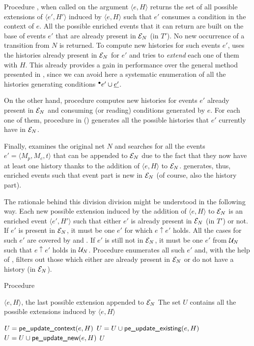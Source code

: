 Procedure \peupdatecont{}, when called on the argument $\langle e, H \rangle$
returns the set of all possible extensions of $\langle e', H' \rangle$ induced
by $\langle e, H \rangle$ such that $e'$ consumes a condition in the context of
$e$.  All the possible enriched events that it can return are built on the base
of events $e'$ that are already present in $\mathcal{E}_{N}$ (in $T'$).  No new
occurrence of a transition from $N$ is returned.  To compute new histories for
such events $e'$, \peupdatecont{} uses the histories already present in $\mathcal{E}_{N}$ for $e'$ and tries to \textit{extend} each one of them with $H$.  This
already provides a gain in performance over the general method presented in
, since we can avoid here a systematic enumeration
of all the histories generating conditions ${}^\bullet e' \cup \underline{e'}$.

On the other hand, procedure \peupdatexisting{} computes new histories for
events $e'$ already present in $\mathcal{E}_{N}$ and consuming (or reading) conditions
generated by $e$.  For each one of them, procedure in \peupdategenhist{}
() generates all the possible histories that $e'$
currently have in $\mathcal{E}_{N}$.

Finally, \peupdatenew{} examines the original net $N$ and searches for all the
events $e' = \langle M_p, M_c, t\rangle$ that can be appended to $\mathcal{E}_{N}$ due
to the fact that they now have at least one history thanks to the addition of
$\langle e, H \rangle$ to $\mathcal{E}_{N}$.   generates, thus,
enriched events such that event part is new in $\mathcal{E}_{N}$ (of course, also the
history part).

The rationale behind this division division might be understood in the
following way.  Each new possible extension induced by the addition of $\langle
e, H \rangle$ to $\mathcal{E}_{N}$ is an enriched event $\langle e', H'\rangle$ such
that either $e'$ is already present in $\mathcal{E}_{N}$ (in $T'$) or not.  If $e'$ is
present in $\mathcal{E}_{N}$, it must be one $e'$ for which $e \uparrow e'$ holds.  All
the cases for such $e'$ are covered by \peupdatecont{} and \peupdatexisting{}.
If $e'$ is still not in $\mathcal{E}_{N}$, it must be one $e'$ from $\mathcal{U}_{N}$ such that
$e \uparrow e'$ holds in $\mathcal{U}_{N}$.  Procedure \peupdatenew{} enumerates all
such $e'$ and, with the help of \peupdategenhist{}, filters out those which
either are already present in $\mathcal{E}_{N}$ or do not have a history (in $\mathcal{E}_{N}$).

\begin{algorithm}
\caption{Procedure \peupdate{}}
\label{alg:pe.update}

\begin{algorithmic}
\REQUIRE $\langle e, H \rangle$, the last possible extension appended to $\mathcal{E}_{N}$
\ENSURE The set $U$ contains all the possible extensions induced by $\langle e,
H \rangle$

\STATE $U = \mbox{\sf pe\_update\_context} (e, H)$
\STATE $U = U \cup \mbox{\sf pe\_update\_existing} (e, H)$
\STATE $U = U \cup \mbox{\sf pe\_update\_new} (e, H)$
\RETURN $U$

\end{algorithmic}
\end{algorithm}

